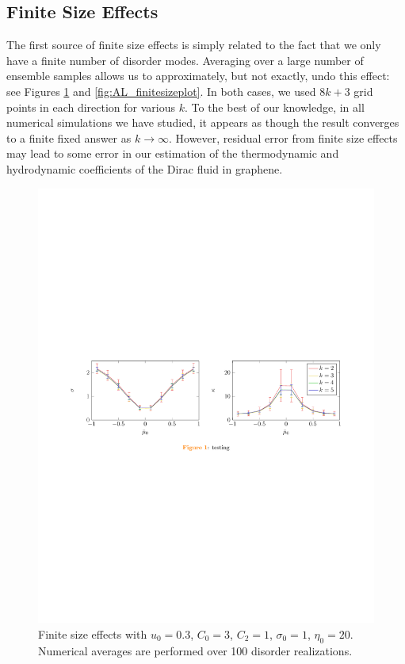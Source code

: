  
\subsection{Finite Size Effects}
The first source of finite size effects is simply related to the fact that we only have a finite number of disorder modes.   Averaging over a large number of ensemble samples allows us to approximately, but not exactly, undo this effect:  see Figures \ref{fig:AL_finitesize2plot} and  \ref{fig:AL_finitesizeplot}.   In both cases,  we used $8k+3$ grid points in each direction for various $k$.   To the best of our knowledge, in all numerical simulations we have studied, it appears as though the result converges to a finite fixed answer as $k\rightarrow \infty$.  However, residual error from finite size effects may lead to some error in our estimation of the thermodynamic and hydrodynamic coefficients of the Dirac fluid in graphene.

\begin{figure}[t]
\centering
\includegraphics[width=\textwidth]{figures/appendix/theory/finitesizeplot2.pdf}
\caption{Finite size effects with $u_0=0.3$, $C_0=3$, $C_2=1$, $\sigma_0=1$, $\eta_0=20$.  Numerical averages are performed over 100 disorder realizations.}
\label{fig:AL_finitesize2plot}
\end{figure}

